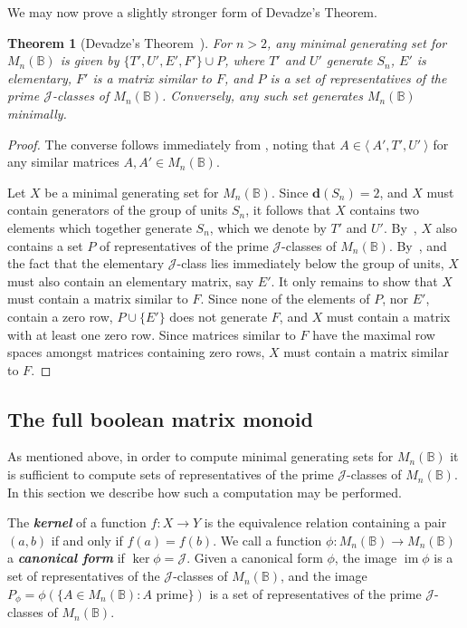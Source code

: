 \documentclass[11pt]{article}
\newtheorem{thm}{Theorem}[subsection]
\newcommand{\defn}[1]{\textbf{\textit{#1}}}
\numberwithin{equation}{section}
\newcommand{\set}[2]{\ensuremath{\{#1 : #2 \}}}
\newcommand{\genset}[1]{\ensuremath{\langle\: #1 \:\rangle}}
\renewcommand{\to}{\longrightarrow}
\DeclareMathOperator{\im}{im}
\newcommand{\B}{\mathbb{B}}
\newcommand{\Bn}{M_n(\B)}
\newcommand{\J}{\mathscr{J}}
\begin{document}
We may now prove a slightly stronger form of Devadze's Theorem.

\begin{thm}[Devadze's Theorem~\cite{Konieczny2011aa}]
  For $n > 2$, any minimal generating set for $\Bn$ is given by $\{T', U', E',
    F'\} \cup P$, where $T'$ and $U'$ generate $S_n$, $E'$ is elementary, $F'$
  is a matrix similar to $F$, and $P$ is a set of representatives of the prime
  $\J$-classes of $\Bn$. Conversely, any such set generates $\Bn$ minimally.
\end{thm}
\begin{proof}
  The converse follows immediately from , noting that $A
  \in \genset{A', T', U'}$ for any similar matrices $A, A' \in \Bn$.

  Let $X$ be a minimal generating set for $\Bn$. Since $\mathbf{d}(S_n) = 2$,
  and $X$ must contain generators of the group of units $S_n$, it follows that
  $X$ contains two elements which together generate $S_n$, which we denote by
  $T'$ and $U'$. By~\cite[Lemma 4.2]{Konieczny2011aa}, $X$ also contains a set
  $P$ of representatives of the prime $\J$-classes of $\Bn$. By~\cite[Lemma
  4.5]{Konieczny2011aa}, and the fact that the elementary $\J$-class lies
  immediately below the group of units, $X$ must also contain an elementary
  matrix, say $E'$. It only remains to show that $X$ must contain a matrix
  similar to $F$. Since none of the elements of $P$, nor $E'$, contain a
  zero row, $P \cup \{E'\}$ does not generate $F$, and $X$ must contain a matrix
  with at least one zero row. Since matrices similar to $F$ have the maximal row
  spaces amongst matrices containing zero rows, $X$ must contain a matrix
  similar to $F$.
\end{proof} 

\subsection{The full boolean matrix monoid}
\label{sec:FullBoolMat}
As mentioned above, in order to compute minimal generating sets for $\Bn$ it is
sufficient to compute sets of representatives of the prime $\J$-classes of
$\Bn$. In this section we describe how such a computation may be performed.

The \defn{kernel} of a function $f: X \to Y$ is the equivalence relation
containing a pair $(a, b)$ if and only if $f(a) = f(b)$.
We call a function $\phi: \Bn \to \Bn$ a \defn{canonical form} if
$\ker\phi = \J$. Given a canonical form $\phi$, the image $\im\phi$ is a
set of representatives of the $\J$-classes of $\Bn$, and the image
$P_\phi = \phi(\set{A \in \Bn}{\text{$A$ prime}})$ is a set of
representatives of the prime $\J$-classes of $\Bn$. 
\end{document}
